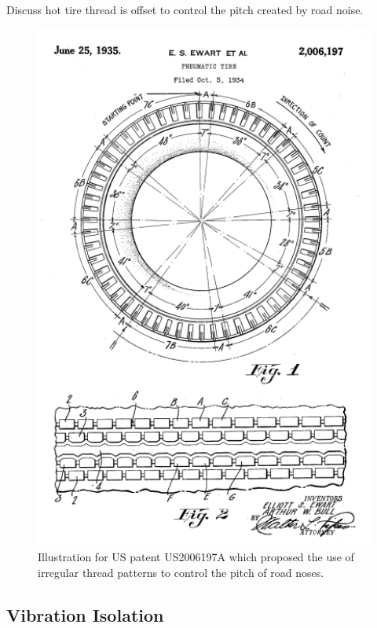 \documentclass[12pt,letter]{article}
\begin{document}
		\begin{vibration_case_study}
	Discuss hot tire thread is offset to control the pitch created by road noise.
	\begin{figure}[H]
		\centering
		\includegraphics[width=4.5in]{../figures/tire_tred_patent.png}
		\caption{Illustration for US patent US2006197A which proposed the use of irregular thread patterns to control the pitch of road noses\protect\footnotemark[1].}
	\end{figure}	
\end{vibration_case_study}








\subsection{Vibration Isolation}

\end{document}
